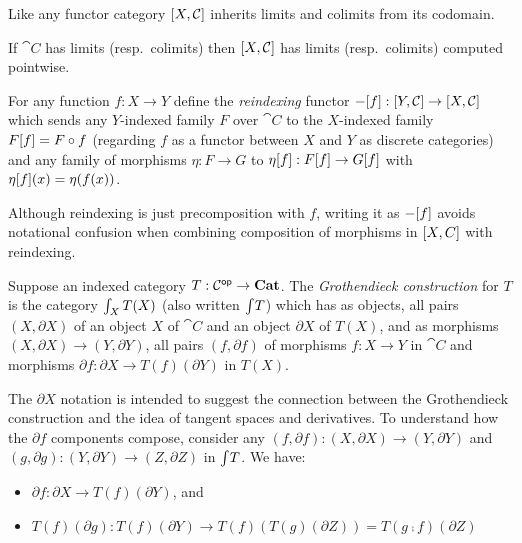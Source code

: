 Like any functor category $[X,\mathcal{C}]$ inherits limits and colimits from its codomain.

\begin{proposition}
If $\cat{C}$ has limits (resp.~colimits) then $[X,\mathcal{C}]$ has limits (resp.~colimits) computed
pointwise.
\end{proposition}

\begin{definition}[Reindexing]
For any function $f: X \to Y$ define the \emph{reindexing} functor $-[f]: [Y,\mathcal{C}] \to
[X,\mathcal{C}]$ which sends any $Y$-indexed family $F$ over $\cat{C}$ to the $X$-indexed family
$F[f] = F \circ f$ (regarding $f$ as a functor between $X$ and $Y$ as discrete categories) and any
family of morphisms $\eta: F \to G$ to $\eta[f]: F[f] \to G[f]$ with
$\eta[f](x) = \eta(f(x))$.
\end{definition}

Although reindexing is just precomposition with $f$, writing it as $-[f]$ avoids notational
confusion when combining composition of morphisms in $[X,C]$ with reindexing.

\begin{definition}
\label{def:Grothendieck}
Suppose an indexed category $T: \mathcal{C}^{\mathsf{op}} \to \mathbf{Cat}$. The \emph{Grothendieck construction} for $T$ is the
category $\int_{X}T(X)$ (also written $\int_{}T$) which has as objects, all pairs $(X,
\partial X)$ of an object $X$ of $\cat{C}$ and an object $\partial X$ of $T(X)$, and as morphisms $(X,
\partial X) \to (Y, \partial Y)$, all pairs $(f, \partial f)$ of morphisms $f: X \to Y$ in $\cat{C}$ and
morphisms $\partial f: \partial X \to T(f)(\partial Y)$ in $T(X)$.
\end{definition}

\noindent The $\partial X$ notation is intended to suggest the connection between the Grothendieck
construction and the idea of tangent spaces and derivatives. To understand how the $\partial f$ components
compose, consider any $(f, \partial f): (X, \partial X) \to (Y, \partial Y)$ and $(g, \partial g): (Y,
\partial Y) \to (Z, \partial Z)$ in $\int_{}T$. We have:

\begin{itemize}
\item $\partial f: \partial X \to T(f)(\partial Y)$, and
\item $T(f)(\partial g): T(f)(\partial Y) \to T(f)(T(g)(\partial Z)) = T(g \comp f)(\partial Z)$
\end{itemize}

